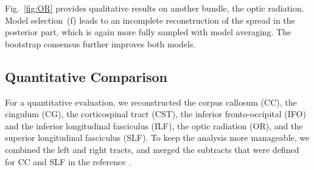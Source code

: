 Fig.~\ref{fig:OR} provides qualitative results on another bundle, the optic radiation. Model selection~(f) leads to an incomplete reconstruction of the spread in the posterior part, which is again more fully sampled with model averaging. The bootstrap consensus further improves both models.

\subsection{Quantitative Comparison}
\label{sec:quantitative-results}

For a quantitative evaluation, we reconstructed the corpus callosum (CC), the
cingulum (CG), the corticospinal tract (CST), the inferior fronto-occipital (IFO)
and the inferior longitudinal fasciculus (ILF), the optic radiation (OR), and
the superior longitudinal fasciculus (SLF). To keep the analysis more manageable, we combined the left and right tracts, and merged the subtracts that were defined for CC and SLF in the reference \cite{WASSERTHAL2018239}.

